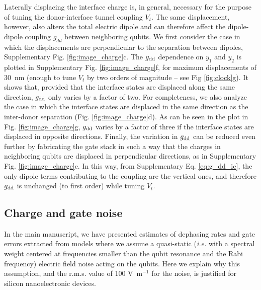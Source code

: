 \documentclass[aps,prb,superscriptaddress,nobibnotes,twocolumn]{revtex4-1}
\begin{document}
Laterally displacing the interface charge is, in general, necessary for the purpose of tuning the donor-interface tunnel coupling $V_t$. The same displacement, however, also alters the total electric dipole and can therefore affect the dipole-dipole coupling $g_{dd}$ between neighboring qubits. We first consider the case in which the displacements are perpendicular to the separation between dipoles, Supplementary Fig. \ref{fig:image_charge}c. The $g_{\rm dd}$ dependence on $y_1$ and $y_2$ is plotted in Supplementary Fig. \ref{fig:image_charge}f, for maximum displacements of 30~nm (enough to tune $V_t$ by two orders of magnitude -- see Fig \ref{fig:clock}g). It shows that, provided that the interface states are displaced along the same direction, $g_{\rm dd}$ only varies by a factor of two. For completeness, we also analyze the case in which the interface states are displaced in the same direction as the inter-donor separation (Fig. \ref{fig:image_charge}d). As can be seen in the plot in Fig. \ref{fig:image_charge}g, $g_{\rm dd}$ varies by a factor of three if the interface states are displaced in opposite directions. Finally, the variation in $g_{\rm dd}$ can be reduced even further by fabricating the gate stack in such a way that the charges in neighboring qubits are displaced in perpendicular directions, as in Supplementary Fig. \ref{fig:image_charge}e. In this way, from Supplementary Eq. \ref{eq:g_dd_ic}, the only dipole terms contributing to the coupling are the vertical ones, and therefore $g_{\rm dd}$ is unchanged (to first order) while tuning $V_t$.


\subsection{\label{App:Elec_noise}Charge and gate noise}

In the main manuscript, we have presented estimates of dephasing rates and gate errors extracted from models where we assume a quasi-static (\textit{i.e.} with a spectral weight centered at frequencies smaller than the qubit resonance and the Rabi frequency) electric field noise acting on the qubits. Here we explain why this assumption, and the r.m.s. value of 100 V~m$^{-1}$ for the noise, is justified for silicon nanoelectronic devices.
\end{document}
